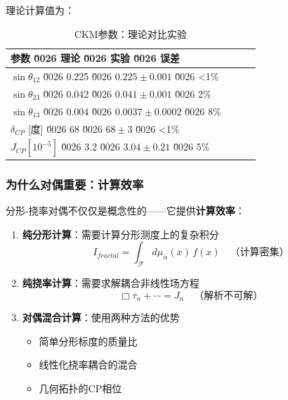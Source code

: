 理论计算值为：

\begin{table}[h]
\centering
\begin{tabular}{lccc}
\toprule
\textbf{参数} \u0026 \textbf{理论} \u0026 \textbf{实验} \u0026 \textbf{误差} \\
\midrule
$\sin\theta_{12}$ \u0026 0.225 \u0026 $0.225 \pm 0.001$ \u0026 <1\% \\
$\sin\theta_{23}$ \u0026 0.042 \u0026 $0.041 \pm 0.001$ \u0026 2\% \\
$\sin\theta_{13}$ \u0026 0.004 \u0026 $0.0037 \pm 0.0002$ \u0026 8\% \\
$\delta_{CP}$ [度] \u0026 68 \u0026 $68 \pm 3$ \u0026 <1\% \\
$J_{CP} [10^{-5}]$ \u0026 3.2 \u0026 $3.04 \pm 0.21$ \u0026 5\% \\
\bottomrule
\end{tabular}
\caption{CKM参数：理论对比实验}
\end{table}

\subsubsection{为什么对偶重要：计算效率}

分形-挠率对偶不仅仅是概念性的——它提供\textbf{计算效率}：

\begin{enumerate}
    \item \textbf{纯分形计算}：需要计算分形测度上的复杂积分
    \begin{equation}
        I_{fractal} = \int_{\mathcal{F}} d\mu_\alpha(x) \, f(x) \quad \text{（计算密集）}
    \end{equation}
    
    \item \textbf{纯挠率计算}：需要求解耦合非线性场方程
    \begin{equation}
        \Box \tau_n + \cdots = J_n \quad \text{（解析不可解）}
    \end{equation}
    
    \item \textbf{对偶混合计算}：使用两种方法的优势
    \begin{itemize}
        \item 简单分形标度的质量比
        \item 线性化挠率耦合的混合
        \item 几何拓扑的CP相位
    \end{itemize}
\end{enumerate}

